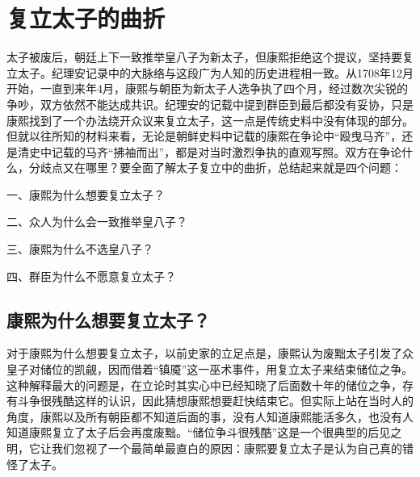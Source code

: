 \chapter{复立太子的曲折}

太子被废后，朝廷上下一致推举皇八子为新太子，但康熙拒绝这个提议，坚持要复立太子。纪理安记录中的大脉络与这段广为人知的历史进程相一致。从1708年12月开始，一直到来年4月，康熙与朝臣为新太子人选争执了四个月，经过数次尖锐的争吵，双方依然不能达成共识。纪理安的记载中提到群臣到最后都没有妥协，只是康熙找到了一个办法绕开众议来复立太子，这一点是传统史料中没有体现的部分。但就以往所知的材料来看，无论是朝鲜史料中记载的康熙在争论中“殴曳马齐”，还是清史中记载的马齐“拂袖而出”，都是对当时激烈争执的直观写照。双方在争论什么，分歧点又在哪里？要全面了解太子复立中的曲折，总结起来就是四个问题：



\begin{bookquote}一、康熙为什么想要复立太子？\end{bookquote}


\begin{bookquote}二、众人为什么会一致推举皇八子？\end{bookquote}


\begin{bookquote}三、康熙为什么不选皇八子？\end{bookquote}


\begin{bookquote}四、群臣为什么不愿意复立太子？\end{bookquote}
\section{康熙为什么想要复立太子？}


对于康熙为什么想要复立太子，以前史家的立足点是，康熙认为废黜太子引发了众皇子对储位的凯觎，因而借着“镇魇”这一巫术事件，用复立太子来结束储位之争。这种解释最大的问题是，在立论时其实心中已经知晓了后面数十年的储位之争，存有斗争很残酷这样的认识，因此猜想康熙想要赶快结束它。但实际上站在当时人的角度，康熙以及所有朝臣都不知道后面的事，没有人知道康熙能活多久，也没有人知道康熙复立了太子后会再度废黜。“储位争斗很残酷”这是一个很典型的后见之明，它让我们忽视了一个最简单最直白的原因：康熙要复立太子是认为自己真的错怪了太子。


